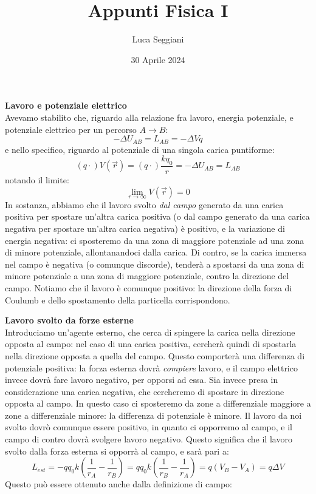 \documentclass[a4paper,12pt]{article}
\title{Appunti Fisica I}
\author{Luca Seggiani}
\date{30 Aprile 2024}
\begin{document}
\maketitle
\par\smallskip
\textbf{Lavoro e potenziale elettrico} \\
Avevamo stabilito che, riguardo alla relazione fra lavoro, energia potenziale, e potenziale elettrico per un percorso $A\rightarrow B$:
$$ -\Delta U_{AB} = L_{AB} = -\Delta V q $$
e nello specifico, riguardo al potenziale di una singola carica puntiforme:
$$ (q \cdot) V(\vec{r}) = (q \cdot) \frac{kq_0}{r} =  -\Delta U_{AB} = L_{AB}$$
notando il limite:
$$ \lim_{r\rightarrow \infty} V({\vec{r}}) = 0$$
In sostanza, abbiamo che il lavoro svolto \textit{dal campo} generato da una carica positiva per spostare un'altra carica positiva (o dal campo generato da una carica negativa per spostare un'altra carica negativa) è positivo, e la variazione di energia negativa: ci sposteremo da una zona di maggiore potenziale
ad una zona di minore potenziale, allontanandoci dalla carica. Di contro, se la carica immersa nel campo è negativa (o comunque discorde), tenderà a spostarsi da una zona di minore potenziale a una zona di maggiore potenziale, contro la direzione del campo. Notiamo che il lavoro è comunque positivo:
la direzione della forza di Coulumb e dello spostamento della particella corrispondono.
\par\smallskip
\textbf{Lavoro svolto da forze esterne} \\
Introduciamo un'agente esterno, che cerca di spingere la carica nella direzione opposta al campo: nel caso di una carica positiva, cercherà quindi di spostarla nella direzione opposta a quella del campo. Questo comporterà una differenza di potenziale positiva:
la forza esterna dovrà \textit{compiere} lavoro, e il campo elettrico invece dovrà fare lavoro negativo, per opporsi ad essa. Sia invece presa in considerazione una carica negativa, che cercheremo di spostare in direzione opposta al campo. In questo caso
ci sposteremo da zone a differenziale maggiore a zone a differenziale minore: la differenza di potenziale è minore. Il lavoro da noi svolto dovrò comunque essere positivo, in quanto ci opporremo al campo, e il campo di contro dovrà svolgere
lavoro negativo. Questo significa che il lavoro svolto dalla forza esterna si opporrà al campo, e sarà pari a:
$$ L_{est} = -qq_0k\left(\frac{1}{r_A} - \frac{1}{r_B}\right) = qq_0k\left(\frac{1}{r_B} - \frac{1}{r_A}\right) = q(V_B - V_A) = q\Delta V$$
Questo può essere ottenuto anche dalla definizione di campo:
\end{document}
